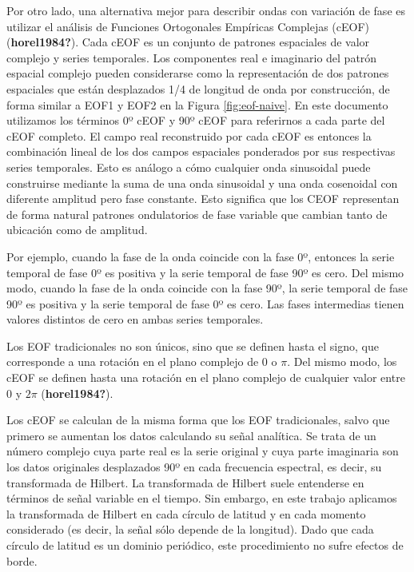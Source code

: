 \documentclass[12pt,oneside]{reedthesis}
\begin{document}
Por otro lado, una alternativa mejor para describir ondas con variación de fase es utilizar el análisis de Funciones Ortogonales Empíricas Complejas (cEOF) (\textbf{horel1984?}).
Cada cEOF es un conjunto de patrones espaciales de valor complejo y series temporales.
Los componentes real e imaginario del patrón espacial complejo pueden considerarse como la representación de dos patrones espaciales que están desplazados 1/4 de longitud de onda por construcción, de forma similar a EOF1 y EOF2 en la Figura \ref{fig:eof-naive}.
En este documento utilizamos los términos 0º cEOF y 90º cEOF para referirnos a cada parte del cEOF completo.
El campo real reconstruido por cada cEOF es entonces la combinación lineal de los dos campos espaciales ponderados por sus respectivas series temporales.
Esto es análogo a cómo cualquier onda sinusoidal puede construirse mediante la suma de una onda sinusoidal y una onda cosenoidal con diferente amplitud pero fase constante.
Esto significa que los CEOF representan de forma natural patrones ondulatorios de fase variable que cambian tanto de ubicación como de amplitud.

Por ejemplo, cuando la fase de la onda coincide con la fase 0º, entonces la serie temporal de fase 0º es positiva y la serie temporal de fase 90º es cero.
Del mismo modo, cuando la fase de la onda coincide con la fase 90º, la serie temporal de fase 90º es positiva y la serie temporal de fase 0º es cero.
Las fases intermedias tienen valores distintos de cero en ambas series temporales.

Los EOF tradicionales no son únicos, sino que se definen hasta el signo, que corresponde a una rotación en el plano complejo de 0 o \(\pi\).
Del mismo modo, los cEOF se definen hasta una rotación en el plano complejo de cualquier valor entre 0 y \(2\pi\) (\textbf{horel1984?}).

Los cEOF se calculan de la misma forma que los EOF tradicionales, salvo que primero se aumentan los datos calculando su señal analítica.
Se trata de un número complejo cuya parte real es la serie original y cuya parte imaginaria son los datos originales desplazados 90º en cada frecuencia espectral, es decir, su transformada de Hilbert.
La transformada de Hilbert suele entenderse en términos de señal variable en el tiempo.
Sin embargo, en este trabajo aplicamos la transformada de Hilbert en cada círculo de latitud y en cada momento considerado (es decir, la señal sólo depende de la longitud).
Dado que cada círculo de latitud es un dominio periódico, este procedimiento no sufre efectos de borde.
\end{document}

